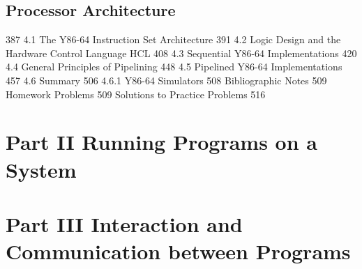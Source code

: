 \documentclass[chapter,oneside]{oblivoir}
\begin{document}
\chapter{Processor Architecture}

387
4.1 The Y86-64 Instruction Set Architecture 391
4.2 Logic Design and the Hardware Control Language HCL 408
4.3 Sequential Y86-64 Implementations 420
4.4 General Principles of Pipelining 448
4.5 Pipelined Y86-64 Implementations 457
4.6 Summary 506
4.6.1 Y86-64 Simulators 508
Bibliographic Notes 509
Homework Problems 509
Solutions to Practice Problems 516




\part{Part II Running Programs on a System}

\chapter{}




\part{Part III Interaction and Communication between Programs}






\end{document}
